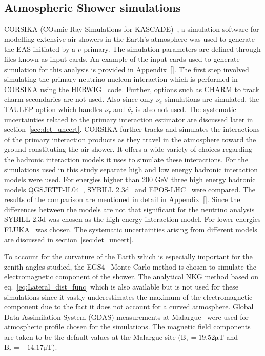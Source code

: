 \subsection{Atmospheric Shower simulations}
\label{subsec:sim_EAS}
CORSIKA (COsmic Ray Simulations for KASCADE)~\cite{Heck:1998vt}, a simulation software for modelling extensive air showers in the Earth's atmosphere was used to generate the EAS initiated by a $\nu$ primary. The simulation parameters are defined through files known as input cards. An example of the input cards used to generate simulation for this analysis is provided in Appendix~\ref{}. The first step involved simulating the primary neutrino-nucleon interaction which is performed in CORSIKA using the HERWIG~\cite{Corcella:2000bw} code. Further, options such as CHARM to track charm secondaries are not used. Also since only $\nu_e$ simulations are simulated, the TAULEP option which handles $\nu_{\tau}$ and $\overline{\nu_{\tau}}$ is also not used. The systematic uncertainties related to the primary interaction estimator are discussed later in section~\ref{sec:det_uncert}. CORSIKA further tracks and simulates the interactions of the primary interaction products as they travel in the atmosphere toward the ground constituting the air shower. It offers a wide variety of choices regarding the hadronic interaction models it uses to simulate these interactions. For the simulations used in this study separate high and low energy hadronic interaction models were used. For energies higher than 200 GeV three high energy hadronic models QGSJETT-II.04~\cite{Ostapchenko:2010vb}, SYBILL 2.3d~\cite{Riehn:2019jet} and EPOS-LHC~\cite{Pierog:2013ria} were compared. The results of the comparison are mentioned in detail in Appendix~\ref{}. Since the differences between the models are not that significant for the neutrino analysis SYBILL 2.3d was chosen as the high energy interaction model. For lower energies FLUKA~\cite{Ferrari:2005zk,Battistoni:2015epi} was chosen. The systematic uncertainties arising from different models are discussed in section~\ref{sec:det_uncert}.  

To account for the curvature of the Earth which is especially important for the zenith angles studied, the EGS4~\cite{Nelson:1990sr} Monte-Carlo method is chosen to simulate the electromagnetic component of the shower. The analytical NKG method based on eq.~\ref{eq:Lateral_dist_func} which is also available but is not used for these simulations since it vastly underestimates the maximum of the electromagnetic component due to the fact it does not account for a curved atmosphere. Global Data Assimilation System (GDAS) measurements at Malargue~\cite{PierreAuger:2012jsu} were used for atmospheric profile chosen for the simulations. The magnetic field components are taken to be the default values at the Malargue site ($\mathrm{B_x = 19.52\mu T}$ and $\mathrm{B_z = -14.17\mu T}$). 

